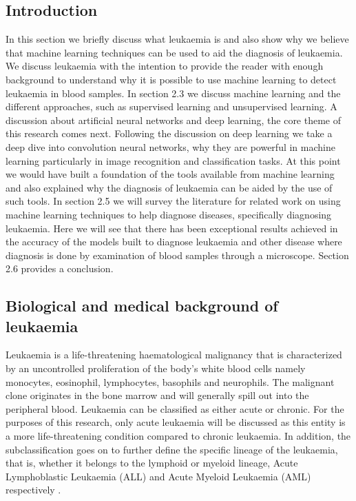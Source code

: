 \documentclass[a4paper,11pt]{article}
\begin{document}
\subsection{Introduction}
In this section we briefly discuss what leukaemia is and also show why we believe that machine learning techniques can be used to  aid the diagnosis of leukaemia. We discuss leukaemia with the intention to provide the reader with enough background to understand why it is possible to use machine learning to detect leukaemia in blood samples. In section 2.3 we discuss machine learning and the different approaches, such as supervised learning and unsupervised learning. A discussion about artificial neural networks and deep learning, the core theme of this research comes next. Following the discussion on deep learning we take a deep dive into convolution neural networks,  why they are powerful in machine learning particularly in image recognition and classification tasks. At this point we would have built a foundation of the tools available from machine learning and also explained why the diagnosis of leukaemia can be aided by the use of such tools. In section 2.5 we will survey the literature for related work on using machine learning techniques to help diagnose diseases, specifically diagnosing leukaemia. Here we will see that there has been exceptional results achieved in the accuracy of the models built to diagnose leukaemia and other disease where diagnosis is done by examination of blood samples through a microscope. Section 2.6 provides a conclusion.
\subsection{Biological and medical background of leukaemia}
\label{section: medical}
Leukaemia is a life-threatening haematological malignancy that is characterized by an uncontrolled
proliferation of the body's white blood cells namely monocytes, eosinophil, lymphocytes, basophils and neurophils. The malignant clone originates in the bone marrow and will generally spill out into the peripheral blood. Leukaemia can be classified as either acute or chronic. For the purposes of this research, only acute leukaemia will be discussed as this entity is a more life-threatening condition compared to chronic leukaemia. In addition, the subclassification goes on to further define the specific lineage of the leukaemia, that is, whether it belongs to the lymphoid or myeloid lineage, Acute Lymphoblastic Leukaemia (ALL) and Acute Myeloid Leukaemia (AML) respectively \citep{Jakkrich}. 
\end{document}
